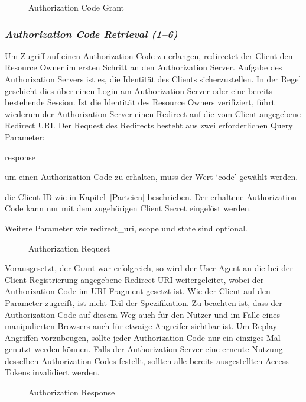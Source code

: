 \begin{figure}[h]
    \scalebox{.5}{
        
    }
    \caption{Authorization Code Grant}\label{fig: Authorization Code Grant}
\end{figure}

\subsubsection{\textit{Authorization Code Retrieval (1--6)}} Um Zugriff auf einen
Authorization Code zu erlangen, redirectet der Client den Resource Owner im
ersten Schritt an den Authorization Server. Aufgabe des Authorization
Servers ist es, die Identität des Clients sicherzustellen. In der Regel
geschieht dies über einen Login am Authorization Server oder eine bereits
bestehende Session. Ist die Identität des Resource Owners verifiziert, führt
wiederum der Authorization Server einen Redirect auf die vom Client
angegebene Redirect URI. Der Request des Redirects besteht aus zwei
erforderlichen Query Parameter:
\begin{labeling}{response}
    \item [response\_type] um einen Authorization Code zu erhalten,
    muss der Wert `code' gewählt werden.
    \item [client\_id] die Client ID wie in Kapitel~\ref{Parteien}
    beschrieben. Der erhaltene Authorization Code kann nur mit dem
    zugehörigen Client Secret eingelöst werden.
\end{labeling}
Weitere Parameter wie redirect\_uri, scope und state sind optional.
\begin{figure}[h]
    \scalebox{.8}{
        
    }
    \caption{Authorization Request}\label{ls: Authorization Request}
\end{figure}
Vorausgesetzt, der Grant war erfolgreich, so wird der User Agent an die bei
der Client-Registrierung angegebene Redirect URI weitergeleitet, wobei der
Authorization Code im URI Fragment gesetzt ist. Wie der Client auf den
Parameter zugreift, ist nicht Teil der Spezifikation. Zu beachten ist, dass
der Authorization Code auf diesem Weg auch für den Nutzer und im Falle eines
manipulierten Browsers auch für etwaige Angreifer sichtbar ist. Um
Replay-Angriffen vorzubeugen, sollte jeder Authorization Code nur ein
einziges Mal genutzt werden können. Falls der Authorization Server eine
erneute Nutzung desselben Authorization Codes festellt, sollten alle bereits
ausgestellten Access-Tokens invalidiert werden.
\begin{figure}[h]
    \scalebox{.8}{
        
    }
    \caption{Authorization Response}\label{ls: Authorization Response}
\end{figure}

